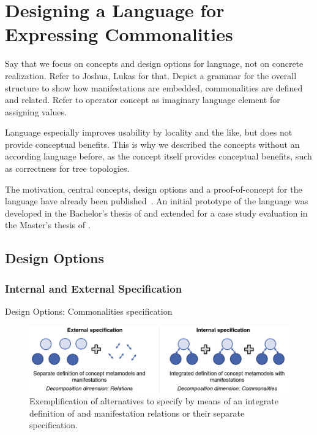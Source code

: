 \chapter{Designing a Language for Expressing Commonalities 
}
\label{chap:language}

Say that we focus on concepts and design options for language, not on concrete realization. Refer to Joshua, Lukas for that.
Depict a grammar for the overall structure to show how manifestations are embedded, commonalities are defined and related. Refer to operator concept as imaginary language element for assigning values.

Language especially improves usability by locality and the like, but does not provide conceptual benefits.
This is why we described the concepts without an according language before, as the concept itself provides conceptual benefits, such as correctness for tree topologies.


The motivation, central concepts, design options and a proof-of-concept for the language have already been published~.
An initial prototype of the language was developed in the Bachelor's thesis of \textcite{gleitze2017a} and extended for a case study evaluation in the Master's thesis of \textcite{hennig2020a}.


\section{Design Options}

\subsection{Internal and External Specification}

Design Options: Commonalities specification

\begin{figure}
    \centering
    \includegraphics[width=\textwidth]{figures/quality/language/design_options.png}
    \caption[Design options for \commonalities specification]{Exemplification of alternatives to specify \commonalities by means of an integrate definition of \conceptmetamodels and manifestation relations or their separate specification.}
    \label{fig:language:design_options}
\end{figure}

